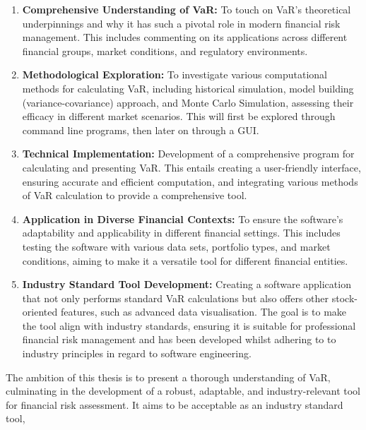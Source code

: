 \documentclass{article}
\begin{document}
\begin{enumerate}
    \item \textbf{Comprehensive Understanding of VaR:} To touch on VaR's theoretical underpinnings and why it has such a pivotal role in modern financial risk management. This includes commenting on its applications across different financial groups, market conditions, and regulatory environments.
    
    \item \textbf{Methodological Exploration:} To investigate various computational methods for calculating VaR, including historical simulation, model building (variance-covariance) approach, and Monte Carlo Simulation, assessing their efficacy in different market scenarios. This will first be explored through command line programs, then later on through a GUI\@.
    
    \item \textbf{Technical Implementation:} Development of a comprehensive program for calculating and presenting VaR. This entails creating a user-friendly interface, ensuring accurate and efficient computation, and integrating various methods of VaR calculation to provide a comprehensive tool.
    
    \item \textbf{Application in Diverse Financial Contexts:} To ensure the software's adaptability and applicability in different financial settings. This includes testing the software with various data sets, portfolio types, and market conditions, aiming to make it a versatile tool for different financial entities.
    
    \item \textbf{Industry Standard Tool Development:} Creating a software application that not only performs standard VaR calculations but also offers other stock-oriented features, such as advanced data visualisation. The goal is to make the tool align with industry standards, ensuring it is suitable for professional financial risk management and has been developed whilst adhering to to industry principles in regard to software engineering.
\end{enumerate}

The ambition of this thesis is to present a thorough understanding of VaR, culminating in the development of a robust, adaptable, and industry-relevant tool for financial risk assessment. It aims to be acceptable as an industry standard tool, 
  
\end{document}
